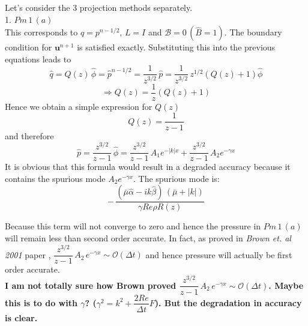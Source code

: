 Let's consider the 3 projection methods separately.\\
1. $Pm\,1 \, (a)$\\
This corresponds to $q = p^{n-1/2}$, $L = I$ and $\mathcal{B} = 0 \, (\hat{B} = 1)$. The boundary condition for $\textbf{u}^{n+1}$ is satisfied exactly. Substituting this into the previous equations leads to
\begin{equation*}
\hat{q} = Q(z)\,\hat{\phi} = \hat{p}^{n-1/2} = \dfrac{1}{z^{3/2}}\,\hat{p} = \dfrac{1}{z^{3/2}} \, z^{1/2} (Q(z) + 1) \hat{\phi}
\end{equation*}
\begin{equation*}
\Rightarrow Q(z) = \dfrac{1}{z} (Q(z) + 1)
\end{equation*}
Hence we obtain a simple expression for $Q(z)$
\begin{equation}
Q(z) = \dfrac{1}{z-1}
\end{equation}
and therefore
\begin{equation}
\hat{p} = \dfrac{z^{3/2}}{z-1} \, \hat{\phi} = \dfrac{z^{3/2}}{z-1}\, A_1 e^{-|k|x} + \dfrac{z^{3/2}}{z-1} \, A_2 e^{-\gamma x}
\end{equation}
It is obvious that this formula would result in a degraded accuracy because it contains the spurious mode $A_2 e^{-\gamma x}$. The spurious mode is:
\begin{equation*}
- \, \dfrac{(\bar{\mu} \hat{\alpha} - ik \hat{\beta})\,(\bar{\mu} + |k|)}{\gamma Re \rho R(z)}
\end{equation*}

Because this term will not converge to zero and hence the pressure in $Pm \, 1\,(a)$ will remain less than second order accurate. In fact, as proved in \emph{Brown et. al 2001} paper \cite{brown2001accurate}, $\dfrac{z^{3/2}}{z-1}\,A_2 \,e^{-\gamma x} \sim \mathcal{O} (\Delta t)$ and hence pressure will actually be first order accurate.\\
\textbf{I am not totally sure how Brown proved $\dfrac{z^{3/2}}{z-1}\,A_2 \,e^{-\gamma x} \sim \mathcal{O} (\Delta t)$. Maybe this is to do with $\gamma$? ($\gamma^2 = k^2 + \dfrac{2Re}{\Delta t}F$). But the degradation in accuracy is clear. }\\

